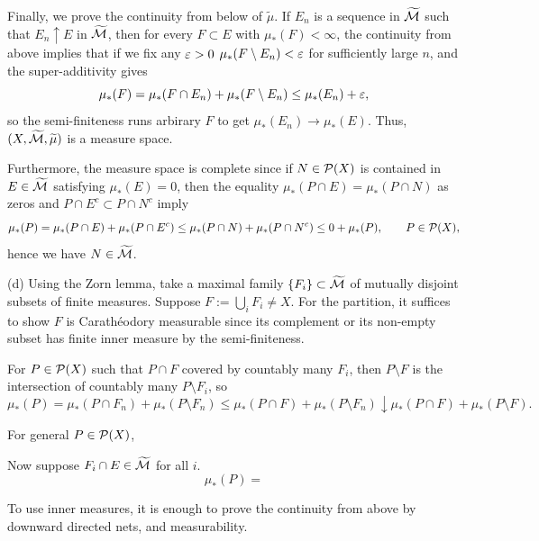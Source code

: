 \documentclass{../../large}
\begin{document}
\begin{pf}
Finally, we prove the continuity from below of $\tilde\mu$.
If $E_n$ is a sequence in $\widetilde{\mathcal{M}}$ such that $E_n\uparrow E$ in $\widetilde{\mathcal{M}}$, then for every $F\subset E$ with $\mu_*(F)<\infty$, the continuity from above implies that if we fix any $\varepsilon>0$ $\mu_*(F\setminus E_n)<\varepsilon$ for sufficiently large $n$, and the super-additivity gives
\[\mu_*(F)=\mu_*(F\cap E_n)+\mu_*(F\setminus E_n)\le\mu_*(E_n)+\varepsilon,\]
so the semi-finiteness runs arbirary $F$ to get $\mu_*(E_n)\to\mu_*(E)$.
Thus, $(X,\widetilde{\mathcal{M}},\widetilde\mu)$ is a measure space.

Furthermore, the measure space is complete since if $N\in\mathcal{P}(X)$ is contained in $E\in\widetilde{\mathcal{M}}$ satisfying $\mu_*(E)=0$, then the equality $\mu_*(P\cap E)=\mu_*(P\cap N)$ as zeros and $P\cap E^c\subset P\cap N^c$ imply
\[\mu_*(P)=\mu_*(P\cap E)+\mu_*(P\cap E^c)\le\mu_*(P\cap N)+\mu_*(P\cap N^c)\le0+\mu_*(P),\qquad P\in\mathcal{P}(X),\]
hence we have $N\in\widetilde{\mathcal{M}}$.

(d)
Using the Zorn lemma, take a maximal family $\{F_i\}\subset\widetilde{\mathcal{M}}$ of mutually disjoint subsets of finite measures.
Suppose $F:=\bigcup_iF_i\ne X$.
For the partition, it suffices to show $F$ is Carath\'eodory measurable since its complement or its non-empty subset has finite inner measure by the semi-finiteness.

For $P\in\mathcal{P}(X)$ such that $P\cap F$ covered by countably many $F_i$, then $P\setminus F$ is the intersection of countably many $P\setminus F_i$, so
\[\mu_*(P)=\mu_*(P\cap F_n)+\mu_*(P\setminus F_n)\le\mu_*(P\cap F)+\mu_*(P\setminus F_n)\downarrow\mu_*(P\cap F)+\mu_*(P\setminus F).\]

For general $P\in\mathcal{P}(X)$,



Now suppose $F_i\cap E\in\widetilde{\mathcal{M}}$ for all $i$.
\[\mu_*(P)=\]
\end{pf}

To use inner measures, it is enough to prove the continuity from above by downward directed nets, and measurability.
\end{document}
